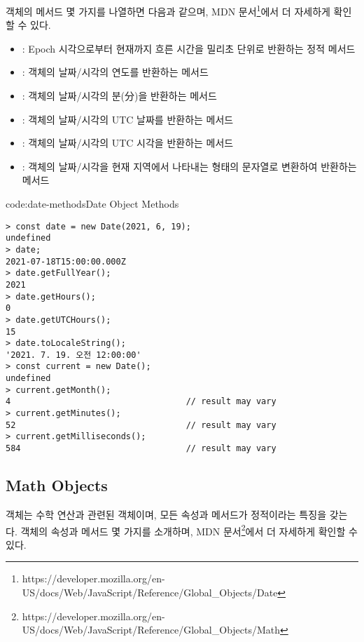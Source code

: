  객체의 메서드 몇 가지를 나열하면 다음과 같으며, MDN 문서\footnote{https://developer.mozilla.org/en-US/docs/Web/JavaScript/Reference/Global\_Objects/Date}에서 더 자세하게 확인할 수 있다.

\begin{itemize}
    \item {}: Epoch 시각으로부터 현재까지 흐른 시간을 밀리초 단위로 반환하는 정적 메서드
    \item {}:  객체의 날짜/시각의 연도를 반환하는 메서드
    \item {}:  객체의 날짜/시각의 분(分)을 반환하는 메서드
    \item {}:  객체의 날짜/시각의 UTC 날짜를 반환하는 메서드
    \item {}:  객체의 날짜/시각의 UTC 시각을 반환하는 메서드
    \item {}:  객체의 날짜/시각을 현재 지역에서 나타내는 형태의 문자열로 변환하여 반환하는 메서드
\end{itemize}

\begin{codeenv}{code:date-methods}{Date Object Methods}\begin{verbatim}
> const date = new Date(2021, 6, 19);
undefined
> date;
2021-07-18T15:00:00.000Z
> date.getFullYear();
2021
> date.getHours();
0
> date.getUTCHours();
15
> date.toLocaleString();
'2021. 7. 19. 오전 12:00:00'
> const current = new Date();
undefined
> current.getMonth();
4                                   // result may vary
> current.getMinutes();
52                                  // result may vary
> current.getMilliseconds();
584                                 // result may vary
\end{verbatim}
\end{codeenv}


\subsection*{Math Objects}

 객체는 수학 연산과 관련된 객체이며, 모든 속성과 메서드가 정적이라는 특징을 갖는다.  객체의 속성과 메서드 몇 가지를 소개하며, MDN 문서\footnote{https://developer.mozilla.org/en-US/docs/Web/JavaScript/Reference/Global\_Objects/Math}에서 더 자세하게 확인할 수 있다.

